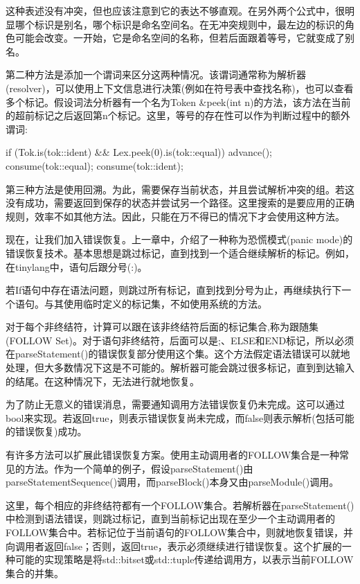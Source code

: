 这种表述没有冲突，但也应该注意到它的表达不够直观。在另外两个公式中，很明显哪个标识是别名，哪个标识是命名空间名。在无冲突规则中，最左边的标识的角色可能会改变。一开始，它是命名空间的名称，但若后面跟着等号，它就变成了别名。

第二种方法是添加一个谓词来区分这两种情况。该谓词通常称为解析器(resolver)，可以使用上下文信息进行决策(例如在符号表中查找名称)，也可以查看多个标记。假设词法分析器有一个名为Token \&peek(int n)的方法，该方法在当前的超前标记之后返回第n个标记。这里，等号的存在性可以作为判断过程中的额外谓词:

\begin{cpp}
if (Tok.is(tok::ident) && Lex.peek(0).is(tok::equal)) {
    advance();
    consume(tok::equal);
}
consume(tok::ident);
\end{cpp}

第三种方法是使用回溯。为此，需要保存当前状态，并且尝试解析冲突的组。若这没有成功，需要返回到保存的状态并尝试另一个路径。这里搜索的是要应用的正确规则，效率不如其他方法。因此，只能在万不得已的情况下才会使用这种方法。

现在，让我们加入错误恢复。上一章中，介绍了一种称为恐慌模式(panic mode)的错误恢复技术。基本思想是跳过标记，直到找到一个适合继续解析的标记。例如，在tinylang中，语句后跟分号(:)。

若If语句中存在语法问题，则跳过所有标记，直到找到分号为止，再继续执行下一个语句。与其使用临时定义的标记集，不如使用系统的方法。

对于每个非终结符，计算可以跟在该非终结符后面的标记集合,称为跟随集(FOLLOW Set)。对于语句非终结符，后面可以是;、ELSE和END标记，所以必须在parseStatement()的错误恢复部分使用这个集。这个方法假定语法错误可以就地处理，但大多数情况下这是不可能的。解析器可能会跳过很多标记，直到到达输入的结尾。在这种情况下，无法进行就地恢复。

为了防止无意义的错误消息，需要通知调用方法错误恢复仍未完成。这可以通过bool来实现。若返回true，则表示错误恢复尚未完成，而false则表示解析(包括可能的错误恢复)成功。

有许多方法可以扩展此错误恢复方案。使用主动调用者的FOLLOW集合是一种常见的方法。作为一个简单的例子，假设parseStatement()由parseStatementSequence()调用，而parseBlock()本身又由parseModule()调用。

这里，每个相应的非终结符都有一个FOLLOW集合。若解析器在parseStatement()中检测到语法错误，则跳过标记，直到当前标记出现在至少一个主动调用者的FOLLOW集合中。若标记位于当前语句的FOLLOW集合中，则就地恢复错误，并向调用者返回false；否则，返回true，表示必须继续进行错误恢复。这个扩展的一种可能的实现策略是将std::bitset或std::tuple传递给调用方，以表示当前FOLLOW集合的并集。


